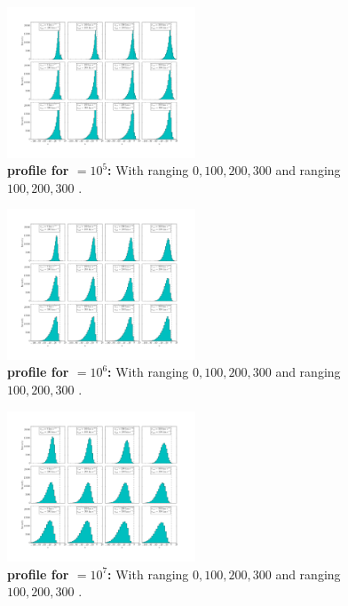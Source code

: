 \documentclass{latex/emulateapj}
\begin{document}
\begin{figure}[h!]
\begin{center}
  \includegraphics[width=0.5\textwidth]{./figures/tau10E5.png}
\end{center}
\caption{\textbf{\lya profile for \tauh$=10^5$:} With \vrot ranging $0,100,200,300$ \kms and \vout ranging $100,200,300$ \kms.
\label{fig:tau10E5}}
\end{figure}

\begin{figure}[h!]
\begin{center}
  \includegraphics[width=0.5\textwidth]{./figures/tau10E6.png}
\end{center}
\caption{\textbf{\lya profile for \tauh$=10^6$:} With \vrot ranging $0,100,200,300$ \kms and \vout ranging $100,200,300$ \kms.
\label{fig:tau10E6}}
\end{figure}

\begin{figure}[h!]
\begin{center}
  \includegraphics[width=0.5\textwidth]{./figures/tau10E7.png}
\end{center}
\caption{\textbf{\lya profile for \tauh$=10^7$:} With \vrot ranging $0,100,200,300$ \kms and \vout ranging $100,200,300$ \kms.
\label{fig:tau10E7}}
\end{figure}
\end{document}
